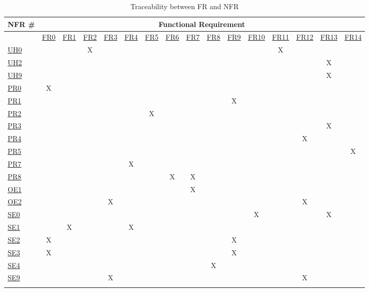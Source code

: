 \documentclass[12pt]{article}
\begin{document}
\setlength\LTleft{-2cm}
\begin{longtable}{l|ccccccccccccccc}

NFR \# & \multicolumn{15}{c}{Functional Requirement} \\ \hline
\endfirsthead
%
\endhead
%
 & \hyperref[sec:FR0]{FR0} & \hyperref[sec:FR1]{FR1} & \hyperref[sec:FR2]{FR2} & \hyperref[sec:FR3]{FR3} & \hyperref[sec:FR4]{FR4} & \hyperref[sec:FR5]{FR5} & \hyperref[sec:FR6]{FR6} & \hyperref[sec:FR7]{FR7} & \hyperref[sec:FR8]{FR8} & \hyperref[sec:FR9]{FR9} & \hyperref[sec:FR10]{FR10} & \hyperref[sec:FR11]{FR11} & \hyperref[sec:FR12]{FR12} & \hyperref[sec:FR13]{FR13} & \hyperref[sec:FR14]{FR14} \\
\hyperref[sec:UH0]{UH0} &  &  & X &  &  &  &  &  &  &  &  & X &  &  &  \\
\hyperref[sec:UH2]{UH2} &  &  &  &  &  &  &  &  &  &  &  &  &  & X &  \\
\hyperref[sec:UH9]{UH9} &  &  &  &  &  &  &  &  &  &  &  &  &  & X &  \\
\hyperref[sec:PR0]{PR0} & X &  &  &  &  &  &  &  &  &  &  &  &  &  &  \\
\hyperref[sec:PR1]{PR1} &  &  &  &  &  &  &  &  &  & X &  &  &  &  &  \\
\hyperref[sec:PR2]{PR2} &  &  &  &  &  & X &  &  &  &  &  &  &  &  &  \\
\hyperref[sec:PR3]{PR3} &  &  &  &  &  &  &  &  &  &  &  &  &  & X &  \\
\hyperref[sec:PR4]{PR4} &  &  &  &  &  &  &  &  &  &  &  &  & X &  &  \\
\hyperref[sec:PR5]{PR5} &  &  &  &  &  &  &  &  &  &  &  &  &  &  & X \\
\hyperref[sec:PR7]{PR7} &  &  &  &  & X &  &  &  &  &  &  &  &  &  &  \\
\hyperref[sec:PR8]{PR8} &  &  &  &  &  &  & X & X &  &  &  &  &  &  &  \\
\hyperref[sec:OE1]{OE1} &  &  &  &  &  &  &  & X &  &  &  &  &  &  &  \\
\hyperref[sec:OE2]{OE2} &  &  &  & X &  &  &  &  &  &  &  &  & X &  &  \\
\hyperref[sec:SE0]{SE0} &  &  &  &  &  &  &  &  &  &  & X &  &  & X &  \\
\hyperref[sec:SE1]{SE1} &  & X &  &  & X &  &  &  &  &  &  &  &  &  &  \\
\hyperref[sec:SE2]{SE2} & X &  &  &  &  &  &  &  &  & X &  &  &  &  &  \\
\hyperref[sec:SE3]{SE3} & X &  &  &  &  &  &  &  &  & X &  &  &  &  &  \\
\hyperref[sec:SE4]{SE4} &  &  &  &  &  &  &  &  & X &  &  &  &  &  &  \\
\hyperref[sec:SE9]{SE9} &  &  &  & X &  &  &  &  &  &  &  &  & X &  & \\
\caption{Traceability between FR and NFR} \\
\end{longtable}
\end{document}
